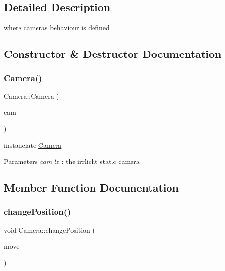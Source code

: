 \subsection{Detailed Description}
where cameras behaviour is defined 

\subsection{Constructor \& Destructor Documentation}
\mbox{\label{classCamera_a4ffc956956f49716d7fa3bff2591cd3a}} 
\subsubsection{\texorpdfstring{Camera()}{Camera()}}
{\footnotesize\ttfamily Camera\+::\+Camera (\begin{DoxyParamCaption}\item[{\hyperlink{classirr_1_1scene_1_1ICameraSceneNode}{irr\+::scene\+::\+I\+Camera\+Scene\+Node} $\ast$const}]{cam }\end{DoxyParamCaption})}



instanciate \hyperlink{classCamera}{Camera} 


\begin{DoxyParams}{Parameters}
{\em cam} & \+: the irrlicht static camera \\
\hline
\end{DoxyParams}


\subsection{Member Function Documentation}
\mbox{\label{classCamera_ad7d58a7f1ab2b31f120a0bdad677b300}} 
\subsubsection{\texorpdfstring{change\+Position()}{changePosition()}}
{\footnotesize\ttfamily void Camera\+::change\+Position (\begin{DoxyParamCaption}\item[{\hyperlink{namespaceirr_1_1core_ae6e2b2a6c552833ebbd5b7463d03586b}{irr\+::core\+::vector3df}}]{move }\end{DoxyParamCaption})}



